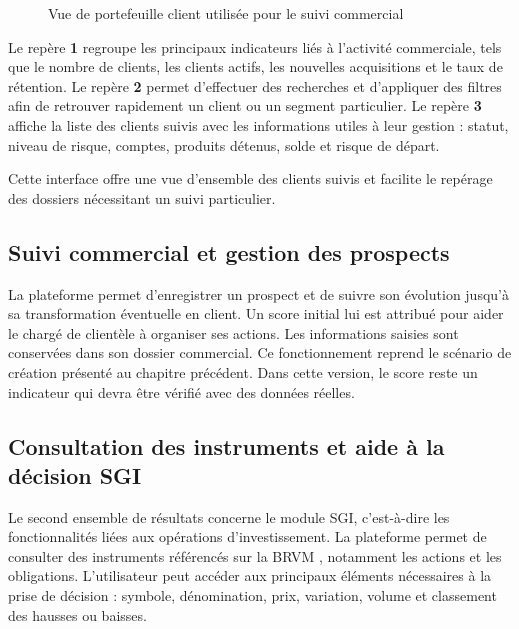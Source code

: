 \begin{figure}[H]
    \centering
    \caption{Vue de portefeuille client utilisée pour le suivi commercial}
    \label{fig:portefeuille_clients}
\end{figure}

\noindent

Le repère \textbf{1} regroupe les principaux indicateurs liés à l'activité commerciale, tels que le nombre de clients, les clients actifs, les nouvelles acquisitions et le taux de rétention. Le repère \textbf{2} permet d'effectuer des recherches et d'appliquer des filtres afin de retrouver rapidement un client ou un segment particulier. Le repère \textbf{3} affiche la liste des clients suivis avec les informations utiles à leur gestion : statut, niveau de risque, comptes, produits détenus, solde et risque de départ.

Cette interface offre une vue d'ensemble des clients suivis et facilite le repérage des dossiers nécessitant un suivi particulier.


\subsection{Suivi commercial et gestion des prospects}

La plateforme permet d'enregistrer un prospect et de suivre son évolution
jusqu'à sa transformation éventuelle en client. Un score initial lui est
attribué pour aider le chargé de clientèle à organiser ses actions. Les
informations saisies sont conservées dans son dossier commercial. Ce
fonctionnement reprend le scénario de création présenté au chapitre précédent.
Dans cette version, le score reste un indicateur qui devra être vérifié avec des
données réelles.

\subsection{Consultation des instruments et aide à la décision SGI}

Le second ensemble de résultats concerne le module SGI, c'est-à-dire les
fonctionnalités liées aux opérations d'investissement. La plateforme permet de
consulter des instruments référencés sur la BRVM \cite{brvm_actions}, notamment les actions et les
obligations. L'utilisateur peut accéder aux principaux
éléments nécessaires à la prise de décision : symbole, dénomination, prix,
variation, volume et classement des hausses ou baisses.

